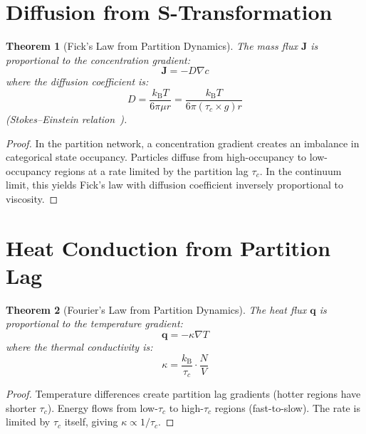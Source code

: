 \documentclass[twocolumn,10pt,a4paper]{article}
\theoremstyle{plain}
\newtheorem{theorem}{Theorem}[section]
\theoremstyle{definition}
\theoremstyle{remark}
\newcommand{\kB}{k_{\mathrm{B}}}
\newcommand{\tauc}{\tau_c}
\begin{document}
\section{Diffusion from S-Transformation}
\label{sec:diffusion}

\begin{theorem}[Fick's Law from Partition Dynamics]
\label{thm:fick}
The mass flux $\mathbf{J}$ is proportional to the concentration gradient:
\begin{equation}
    \mathbf{J} = -D\nabla c
\end{equation}
where the diffusion coefficient is:
\begin{equation}
    D = \frac{\kB T}{6\pi \mu r} = \frac{\kB T}{6\pi (\tauc \times g) r}
\end{equation}
(Stokes--Einstein relation~\cite{einstein1905}).
\end{theorem}

\begin{proof}
In the partition network, a concentration gradient creates an imbalance in categorical state occupancy. Particles diffuse from high-occupancy to low-occupancy regions at a rate limited by the partition lag $\tauc$. In the continuum limit, this yields Fick's law with diffusion coefficient inversely proportional to viscosity.
\end{proof}

\section{Heat Conduction from Partition Lag}
\label{sec:heat}

\begin{theorem}[Fourier's Law from Partition Dynamics]
\label{thm:fourier}
The heat flux $\mathbf{q}$ is proportional to the temperature gradient:
\begin{equation}
    \mathbf{q} = -\kappa \nabla T
\end{equation}
where the thermal conductivity is:
\begin{equation}
    \kappa = \frac{\kB}{\tauc} \cdot \frac{N}{V}
\end{equation}
\end{theorem}

\begin{proof}
Temperature differences create partition lag gradients (hotter regions have shorter $\tauc$). Energy flows from low-$\tauc$ to high-$\tauc$ regions (fast-to-slow). The rate is limited by $\tauc$ itself, giving $\kappa \propto 1/\tauc$.
\end{proof}
\end{document}

